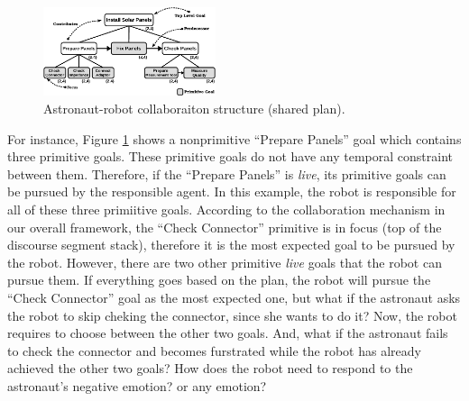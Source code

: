 \documentclass[conference]{IEEEtran}
\begin{document}
\begin{figure}[tbh]
  \centering
  \includegraphics[width=0.45\textwidth]{figure/collaborationStructure-croped.pdf}
  \vspace*{-2mm}
  \caption{{\fontsize{9}{9}\selectfont Astronaut-robot collaboraiton structure
  (shared plan).}}
  \label{fig:taskModel}
\end{figure}

For instance, Figure \ref{fig:taskModel} shows a nonprimitive ``Prepare Panels''
goal which contains three primitive goals. These primitive goals do not have any
temporal constraint between them. Therefore, if the ``Prepare Panels'' is
\textit{live}, its primitive goals can be pursued by the responsible agent. In
this example, the robot is responsible for all of these three primiitive goals.
According to the collaboration mechanism in our overall framework, the ``Check
Connector'' primitive is in focus (top of the discourse segment stack),
therefore it is the most expected goal to be pursued by the robot. However,
there are two other primitive \textit{live} goals that the robot can pursue
them. If everything goes based on the plan, the robot will pursue the ``Check
Connector'' goal as the most expected one, but what if the astronaut asks the
robot to skip cheking the connector, since she wants to do it? Now, the robot
requires to choose between the other two goals. And, what if the astronaut fails
to check the connector and becomes furstrated while the robot has already
achieved the other two goals? How does the robot need to respond to the
astronaut's negative emotion? or any emotion?
\end{document}
